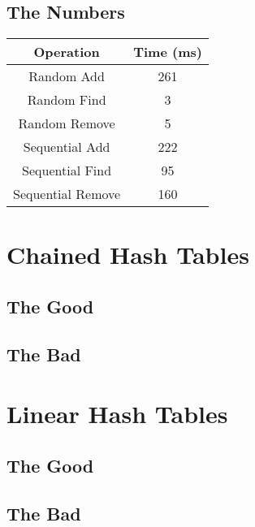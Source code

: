 \documentclass{muformallab}
\begin{document}
  \subsection{The Numbers}

  \begin{center}
    \begin{tabular}{c c}
      Operation & Time (ms) \\
      \hline
      Random Add & 261 \\
      Random Find & 3 \\
      Random Remove & 5 \\
      Sequential Add & 222 \\
      Sequential Find & 95 \\
      Sequential Remove & 160 \\
    \end{tabular}
  \end{center}

  \section{Chained Hash Tables}

  \subsection{The Good}

  \subsection{The Bad}


  \section{Linear Hash Tables}

  \subsection{The Good}

  \subsection{The Bad}
\end{document}
